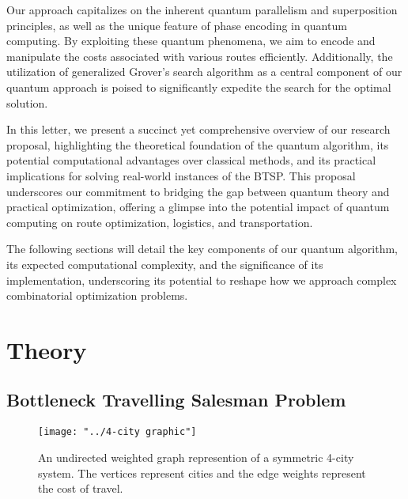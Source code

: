 \documentclass[twocolumn,showpacs,preprintnumbers,amsmath,amssymb]{revtex4}
\begin{document}
		Our approach capitalizes on the inherent quantum parallelism and superposition principles, as well as the unique feature of phase encoding in quantum computing. By exploiting these quantum phenomena, we aim to encode and manipulate the costs associated with various routes efficiently. Additionally, the utilization of generalized Grover's search algorithm as a central component of our quantum approach is poised to significantly expedite the search for the optimal solution.
		
		In this letter, we present a succinct yet comprehensive overview of our research proposal, highlighting the theoretical foundation of the quantum algorithm, its potential computational advantages over classical methods, and its practical implications for solving real-world instances of the BTSP. This proposal underscores our commitment to bridging the gap between quantum theory and practical optimization, offering a glimpse into the potential impact of quantum computing on route optimization, logistics, and transportation.
		
		The following sections will detail the key components of our quantum algorithm, its expected computational complexity, and the significance of its implementation, underscoring its potential to reshape how we approach complex combinatorial optimization problems.
		
		
		\section{Theory}
		
		\subsection{Bottleneck Travelling Salesman Problem}
		
		\begin{figure}[!h]
			\centering
			\texttt{[image: "../4-city graphic"]}
			\caption{An undirected weighted graph represention of a  symmetric 4-city system.  The vertices represent cities and the edge weights represent the cost of travel. }
			\label{fig:4-city-graphic}
		\end{figure}		
		
\end{document}
